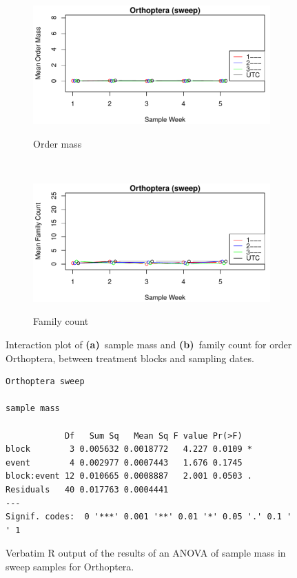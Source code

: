 \documentclass[10pt,letterpaper,twocolumn]{article}
\begin{document}
\begin{figure}[h]
	\centering
	\begin{subfigure}[b]{0.45\textwidth}
		\caption{Order mass}
		\includegraphics[width=\textwidth]{plots/blocks/interaction/mass/mass_sweep_Orthoptera_interplot.pdf}
		\label{fig:sweep_orthoptera_mass_interplot}
	\end{subfigure}
	~
	\begin{subfigure}[b]{0.45\textwidth}
		\caption{Family count}
		\includegraphics[width=\textwidth]{plots/blocks/interaction/family/family_sweep_Orthoptera_interplot.pdf}
		\label{fig:sweep_orthoptera_family_interplot}
	\end{subfigure}
	\caption{Interaction plot of \textbf{(a)}~sample mass and \textbf{(b)}~family count for order Orthoptera, between treatment blocks and sampling dates.}
	\label{fig:sweep_orthoptera_interplot}
	\smallskip
	\nointerlineskip
	\hrulefill
\end{figure}

\begin{figure}[h]
	\lstset{numbers=left}
	\lstset{xleftmargin=5mm,framexleftmargin=5mm}
	\begin{lstlisting}
Orthoptera sweep 

sample mass 

            Df   Sum Sq   Mean Sq F value Pr(>F)  
block        3 0.005632 0.0018772   4.227 0.0109 *
event        4 0.002977 0.0007443   1.676 0.1745  
block:event 12 0.010665 0.0008887   2.001 0.0503 .
Residuals   40 0.017763 0.0004441                 
---
Signif. codes:  0 '***' 0.001 '**' 0.01 '*' 0.05 '.' 0.1 ' ' 1
	\end{lstlisting}
	\caption{Verbatim R output of the results of an ANOVA of sample mass in sweep samples for Orthoptera.}
	\label{fig:sweep_orthoptera_mass_anova}
	\smallskip
	\nointerlineskip
	\hrulefill
\end{figure}
\end{document}
